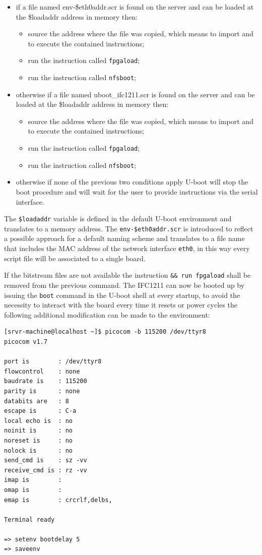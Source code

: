 \documentclass[11pt
  , a4paper
  , article
  , oneside
  , showtrims
]{memoir}
\begin{document}
\begin{itemize}
	\item if a file named env-\$eth0addr.scr is found on the server and can be loaded at the \$loadaddr address in memory then:
	\begin{itemize}
		\item source the address where the file was copied, which means to import and to execute the contained instructions;
		\item run the instruction called \texttt{fpgaload};
		\item run the instruction called \texttt{nfsboot};
	\end{itemize}
	\item otherwise if a file named uboot\_ifc1211.scr is found on the server and can be loaded at the \$loadaddr address in memory then:
	\begin{itemize}
		\item source the address where the file was copied, which means to import and to execute the contained instructions;
		\item run the instruction called \texttt{fpgaload};
		\item run the instruction called \texttt{nfsboot};
	\end{itemize}
	\item otherwise if none of the previous two conditions apply U-boot will stop the boot procedure and will wait for the user to provide instructions via the serial interface.
\end{itemize}

The \texttt{\$loadaddr} variable is defined in the default U-boot environment and translates to a memory address.
The \texttt{env-\$eth0addr.scr} is introduced to reflect a possible approach for a default naming scheme and translates to a file name that includes the MAC address of the network interface \texttt{eth0}, in this way every script file will be associated to a single board.

If the bitstream files are not available the instruction \texttt{\&\& run fpgaload} shall be removed from the previous command.
The IFC1211 can now be booted up by issuing the \texttt{boot} command in the U-boot shell at every startup, to avoid the necessity to interact with the board every time it resets or power cycles the following additional modification can be made to the environment: 

\begin{lstlisting}[style=termstyle]
[srvr-machine@localhost ~]$ picocom -b 115200 /dev/ttyr8
picocom v1.7

port is        : /dev/ttyr8
flowcontrol    : none
baudrate is    : 115200
parity is      : none
databits are   : 8
escape is      : C-a
local echo is  : no
noinit is      : no
noreset is     : no
nolock is      : no
send_cmd is    : sz -vv
receive_cmd is : rz -vv
imap is        : 
omap is        : 
emap is        : crcrlf,delbs,

Terminal ready

=> setenv bootdelay 5
=> saveenv
\end{lstlisting}
\end{document}
